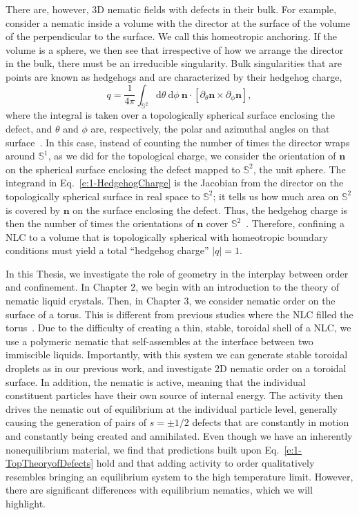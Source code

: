 There are, however, 3D nematic fields with defects in their bulk.
For example, consider a nematic inside a volume with the director at the surface of the volume of the perpendicular to the surface.
We call this homeotropic anchoring.
If the volume is a sphere, we then see that irrespective of how we arrange the director in the bulk, there must be an irreducible singularity.
Bulk singularities that are points are known as hedgehogs and are characterized by their hedgehog charge,
\begin{equation}
  q = \frac{1}{4 \pi} \int_{\mathbb{S}^2} \textrm{d}\theta \: \textrm{d}\phi \: \mathbf{n} \cdot \left [ \partial_{\theta} \mathbf{n} \times \partial_{\phi} \mathbf{n} \right ],\label{e:1-HedgehogCharge}
\end{equation}
where the integral is taken over a topologically spherical surface enclosing the defect, and $\theta$ and $\phi$ are, respectively, the polar and azimuthal angles on that surface~\cite{RN153}.
In this case, instead of counting the number of times the director wraps around $\mathbb{S}^1$, as we did for the topological charge, we consider the orientation of $\mathbf{n}$ on the spherical surface enclosing the defect mapped to $\mathbb{S}^2$, the unit sphere.
The integrand in Eq.~\ref{e:1-HedgehogCharge} is the Jacobian from the director on the topologically spherical surface in real space to $\mathbb{S}^2$; it tells us how much area on $\mathbb{S}^2$ is covered by $\mathbf{n}$ on the surface enclosing the defect.
Thus, the hedgehog charge is then the number of times the orientations of $\mathbf{n}$ cover $\mathbb{S}^2$~\cite{RN153}.
Therefore, confining a NLC to a volume that is topologically spherical with homeotropic boundary conditions must yield a total ``hedgehog charge'' $|q|=1$.

In this Thesis, we investigate the role of geometry in the interplay between order and confinement.
In Chapter 2, we begin with an introduction to the theory of nematic liquid crystals.
Then, in Chapter 3, we consider nematic order on the surface of a torus.
This is different from previous studies where the NLC filled the torus~\cite{RN24,RN274,RN44}.
Due to the difficulty of creating a thin, stable, toroidal shell of a NLC, we use a polymeric nematic that self-assembles at the interface between two immiscible liquids.
Importantly, with this system we can generate stable toroidal droplets as in our previous work, and investigate 2D nematic order on a toroidal surface.
In addition, the nematic is active, meaning that the individual constituent particles have their own source of internal energy.
The activity then drives the nematic out of equilibrium at the individual particle level, generally causing the generation of pairs of $s = \pm 1/2$ defects that are constantly in motion and constantly being created and annihilated.
Even though we have an inherently nonequilibrium material, we find that predictions built upon Eq.~\ref{e:1-TopTheoryofDefects} hold and that adding activity to order qualitatively resembles bringing an equilibrium system to the high temperature limit.
However, there are significant differences with equilibrium nematics, which we will highlight.


